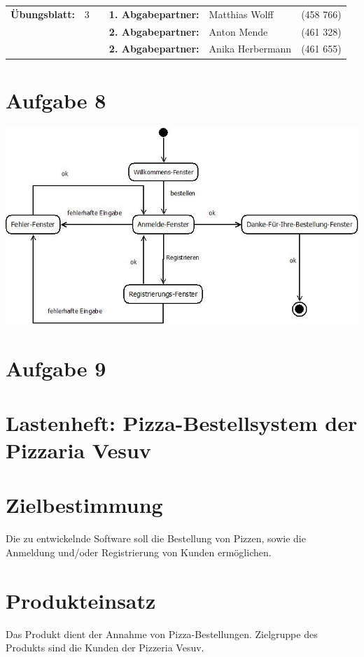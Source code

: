 \newcommand{\obenlinks}{Software Engineering}		%

\usepackage{float}


	\begin{center}
		\begin{tabular}{|rlp{4cm}rll|}
		\hline
		 \textbf{Übungsblatt:} & 3 &   & \textbf{1. Abgabepartner:} & Matthias Wolff & (458 766)  \\
		        & & & \textbf{2. Abgabepartner:} & Anton Mende & (461 328) \\
		        & & & \textbf{2. Abgabepartner:} & Anika Herbermann & (461 655) \\ \hline
		\end{tabular}
	\end{center}
\section*{Aufgabe 8}
\includegraphics[width=\textwidth,height=\textheight,keepaspectratio]{Aufgabe08.jpeg}
\section*{Aufgabe 9}
\section*{Lastenheft: Pizza-Bestellsystem der Pizzaria Vesuv}
\section{Zielbestimmung}
Die zu entwickelnde Software soll die Bestellung von Pizzen, sowie die Anmeldung und/oder Registrierung von Kunden ermöglichen.
\section{Produkteinsatz}
Das Produkt dient der Annahme von Pizza-Bestellungen. Zielgruppe des Produkts sind die Kunden der Pizzeria Vesuv.

